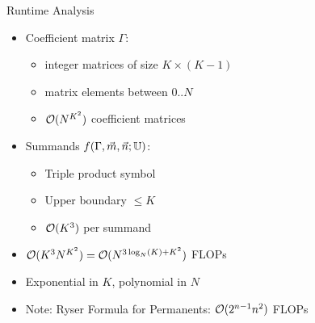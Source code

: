 \begin{frame}{Runtime Analysis}
%
\begin{itemize}
\item Coefficient matrix $\Gamma$:
	\begin{itemize}
	\item integer matrices of size $K \times (K - 1)$
	\item matrix elements between $0..N$
	\item[\Thus] $\mathcal{O}(N^{K^2})$ coefficient matrices
	\end{itemize}
\item Summands $f(\Gamma, \vec{m}, \vec{n}; \mathbb{U})$:
	\begin{itemize}
	\item Triple product symbol
	\item Upper boundary $\leq K$
	\item[\Thus] $\mathcal{O}(K^3)$ per summand
	\end{itemize}
\item[\Thus] $\mathcal{O}(K^3 N^{K^2}) = \mathcal{O}(N^{3\log_N(K) + K^2})$ FLOPs
\item Exponential in $K$, polynomial in $N$
\item Note: Ryser Formula for Permanents: $\mathcal{O}(2^{n - 1} n^2)$ FLOPs
\end{itemize}
%
\end{frame}


